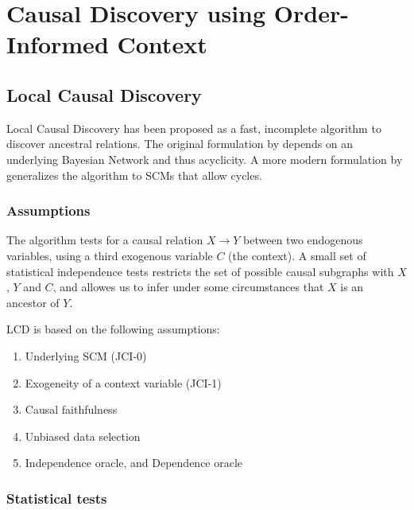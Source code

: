 \newpage
\section{Causal Discovery using Order-Informed Context}




\subsection{Local Causal Discovery}

Local Causal Discovery has been proposed as a fast, incomplete algorithm to discover ancestral relations. The original formulation by \citet{cooper1997simple} depends on an underlying Bayesian Network and thus acyclicity. A more modern formulation by \citet{mooij2016joint} generalizes the algorithm to SCMs that allow cycles. 



\subsubsection{Assumptions}

The algorithm tests for a causal relation $X\to Y$ between two endogenous variables, using a third exogenous variable $C$ (the context). A small set of statistical independence tests restricts the set of possible causal subgraphs with $X$, $Y$ and $C$, and allowes us to infer under some circumstances that $X$ is an ancestor of $Y$. 

LCD is based on the following assumptions:

\begin{enumerate}
    \item Underlying SCM (JCI-0)
    \item Exogeneity of a context variable (JCI-1)
    \item Causal faithfulness
    \item Unbiased data selection
    \item Independence oracle, and Dependence oracle
\end{enumerate}



\subsubsection{Statistical tests}


